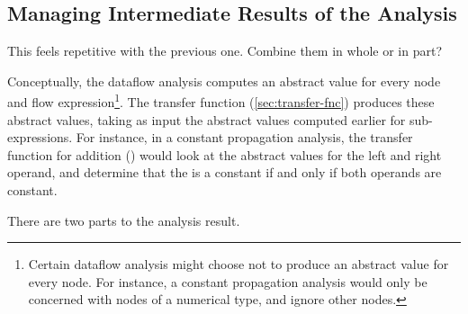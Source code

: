\subsection{Managing Intermediate Results of the Analysis}
\label{sec:node-mapping}
\label{sec:store-management}

\begin{workinprogress}
This feels repetitive with the previous one.  Combine them in whole
  or in part?
\end{workinprogress}

Conceptually, the dataflow analysis computes an abstract value for
every node and flow expression\footnote{Certain dataflow analysis
  might choose not to produce an abstract value for every node.  For
  instance, a constant propagation analysis would only be concerned
  with nodes of a numerical type, and ignore other nodes.}.  The
transfer function (\autoref{sec:transfer-fnc}) produces these abstract
values, taking as input the abstract values computed earlier for
sub-expressions.  For instance, in a constant propagation analysis,
the transfer function for addition (\code{+}) would look at the
abstract values for the left and right operand, and determine that the
 is a constant if and only if both operands are
constant.

There are two parts to the analysis result.

